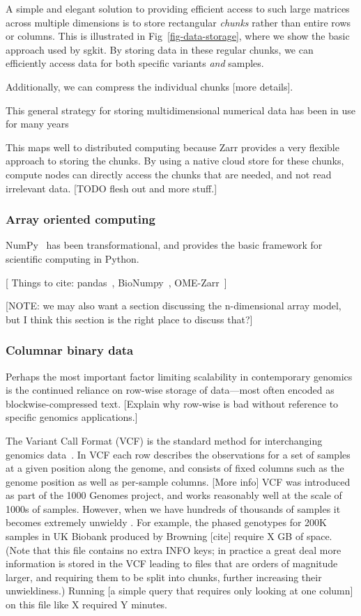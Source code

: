 \documentclass[a4paper,num-refs]{oup-contemporary}
\begin{document}
A simple and elegant solution to providing efficient access to such
large matrices across multiple dimensions is to store rectangular
\emph{chunks} rather than entire rows or columns. This is illustrated
in Fig~\ref{fig-data-storage}, where we show the basic approach
used by sgkit. By storing data in these regular chunks, we
can efficiently access data for both specific variants \emph{and}
samples.

Additionally, we can compress the individual chunks [more details].

This general strategy for storing multidimensional numerical data
has been in use for many years~\citep{folk2011overview}

This maps well to distributed computing because Zarr provides a
very flexible approach to storing the chunks. By using a native cloud store
for these chunks, compute nodes can directly access the chunks that
are needed, and not read irrelevant data.
[TODO flesh out and more stuff.]


\subsubsection{Array oriented computing}

NumPy~\citep{harris2020array} has been transformational, and provides
the basic framework for scientific computing in Python.

[ Things to cite: pandas~\citep{mckinney2010data},
BioNumpy~\citep{rand2022bionumpy}, OME-Zarr~\citep{moore2023ome}]

[NOTE: we may also want a section discussing the n-dimensional array model,
but I think this section is the right place to discuss that?]

\subsubsection{Columnar binary data}

Perhaps the most important factor limiting scalability in contemporary genomics
is the continued reliance on row-wise storage of data---most often
encoded as blockwise-compressed text.
[Explain why row-wise is bad without reference to specific genomics applications.]

The Variant Call Format (VCF) is the standard method for interchanging
genomics data~\citep{danecek2011variant}.
In VCF each row describes the observations for a set of samples
at a given position along the genome, and consists of fixed columns such as the
genome position as well as per-sample columns. [More info]
VCF was introduced as part of the 1000 Genomes project, and works reasonably
well at the scale of 1000s of samples. However, when we have hundreds of
thousands of samples it becomes extremely unwieldy
. For example, the
phased genotypes for 200K samples in UK Biobank produced by Browning [cite]
require X GB of space.
(Note that this file contains no extra INFO keys; in practice a great deal
more information is stored in the VCF leading to files that are orders of
magnitude larger, and requiring them to be split into chunks, further
increasing their unwieldiness.)
Running [a simple query that requires only looking at
one column] on this file like X required Y minutes.
\end{document}
